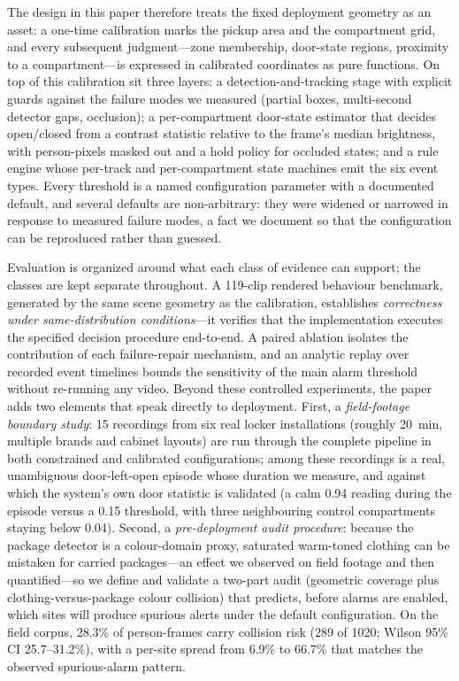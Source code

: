 \documentclass[journal,article,submit,oneauthor]{Definitions/mdpi}
\begin{document}
The design in this paper therefore treats the fixed deployment geometry as an asset: a
one-time calibration marks the pickup area and the compartment grid, and every subsequent
judgment---zone membership, door-state regions, proximity to a compartment---is expressed in
calibrated coordinates as pure functions. On top of this calibration sit three layers: a
detection-and-tracking stage with explicit guards against the failure modes we measured
(partial boxes, multi-second detector gaps, occlusion); a per-compartment door-state
estimator that decides open/closed from a contrast statistic relative to the frame's median
brightness, with person-pixels masked out and a hold policy for occluded states; and a rule
engine whose per-track and per-compartment state machines emit the six event types. Every
threshold is a named configuration parameter with a documented default, and several defaults
are non-arbitrary: they were widened or narrowed in response to measured failure modes, a
fact we document so that the configuration can be reproduced rather than guessed.

Evaluation is organized around what each class of evidence can support; the classes are
kept separate throughout. A 119-clip rendered behaviour benchmark, generated by the same scene
geometry as the calibration, establishes \emph{correctness under same-distribution
conditions}---it verifies that the implementation executes the specified decision procedure
end-to-end. A paired ablation isolates the
contribution of each failure-repair mechanism, and an analytic replay over recorded event
timelines bounds the sensitivity of the main alarm threshold without re-running any video.
Beyond these controlled experiments, the paper adds two elements that speak directly to
deployment. First, a \emph{field-footage boundary study}: 15 recordings from six real locker
installations (roughly 20~min, multiple brands and cabinet layouts) are run through the
complete pipeline in both constrained and calibrated configurations; among these recordings
is a real, unambiguous door-left-open episode whose duration we measure, and against which
the system's own door statistic is validated (a calm 0.94 reading during the episode versus
a 0.15 threshold, with three neighbouring control compartments staying below 0.04). Second,
a \emph{pre-deployment audit procedure}: because the package detector is a colour-domain
proxy, saturated warm-toned clothing can be mistaken for carried packages---an effect we
observed on field footage and then quantified---so we define and validate a two-part audit
(geometric coverage plus clothing-versus-package colour collision) that predicts, before
alarms are enabled, which sites will produce spurious alerts under the default configuration.
On the field corpus, 28.3\% of person-frames carry collision risk (289 of 1020; Wilson
95\% CI 25.7--31.2\%), with a per-site spread from 6.9\% to 66.7\% that matches the observed
spurious-alarm pattern.
\end{document}
